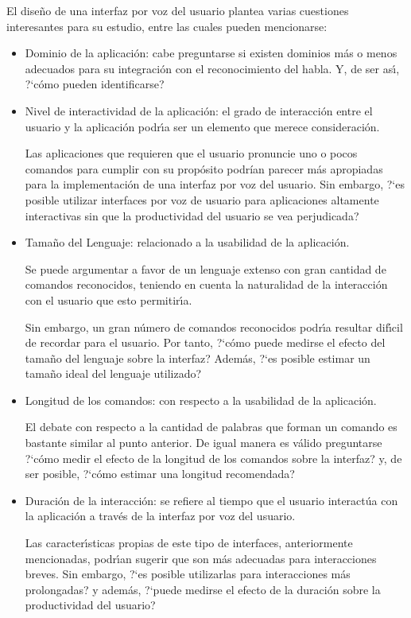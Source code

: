 El dise\~no de una interfaz por voz del usuario plantea varias cuestiones interesantes para
su estudio, entre las cuales pueden mencionarse:

\begin{itemize}
	\item Dominio de la aplicaci\'on: cabe preguntarse si existen dominios m\'as o menos adecuados para su
	integraci\'on con el reconocimiento del habla. Y, de ser as{\'\i}, {?`}c\'omo pueden identificarse?
	
	\item Nivel de interactividad de la aplicaci\'on: el grado de interacci\'on entre el usuario y
	la aplicaci\'on podr{\'\i}a ser un elemento que merece consideraci\'on.
	
	Las aplicaciones que requieren que el usuario pronuncie uno o pocos comandos para cumplir con su
	prop\'osito podr\'ian parecer m\'as apropiadas para la implementaci\'on de una interfaz por voz del usuario.
	Sin embargo, {?`}es posible utilizar interfaces por voz de usuario para aplicaciones altamente
	interactivas sin que la productividad del usuario se vea perjudicada?

	\item Tama\~no del Lenguaje: relacionado a la usabilidad de la aplicaci\'on.

	Se puede argumentar a favor de un lenguaje extenso con gran cantidad de comandos reconocidos, 
	teniendo en cuenta la naturalidad de la interacci\'on con el usuario que esto permitir{\'\i}a.

	Sin embargo, un gran n\'umero de comandos reconocidos podr{\'\i}a resultar dif{\'\i}cil de recordar para
	el usuario. Por tanto, {?`}c\'omo puede medirse el efecto del tama\~no del lenguaje sobre la interfaz? 
	Adem\'as, {?`}es posible estimar un tama\~no ideal del lenguaje utilizado?

	\item Longitud de los comandos: con respecto a la usabilidad de la aplicaci\'on.

	El debate con respecto a la cantidad de palabras que forman un comando es bastante similar
	al punto anterior. De igual manera es v\'alido preguntarse {?`}c\'omo medir el efecto de la longitud
	de los comandos sobre la interfaz? y, de ser posible, {?`}c\'omo estimar una longitud recomendada?

	\item Duraci\'on de la interacci\'on: se refiere al tiempo que el usuario interact\'ua con la aplicaci\'on
	a trav\'es de la interfaz por voz del usuario.

	Las caracter{\'\i}sticas propias de este tipo de interfaces, anteriormente mencionadas, podr{\'\i}an sugerir
	que son m\'as adecuadas para interacciones breves. Sin embargo, {?`}es posible utilizarlas para 
	interacciones m\'as prolongadas? y adem\'as, {?`}puede medirse el efecto de la duraci\'on sobre la
	productividad del usuario? 

\end{itemize}


